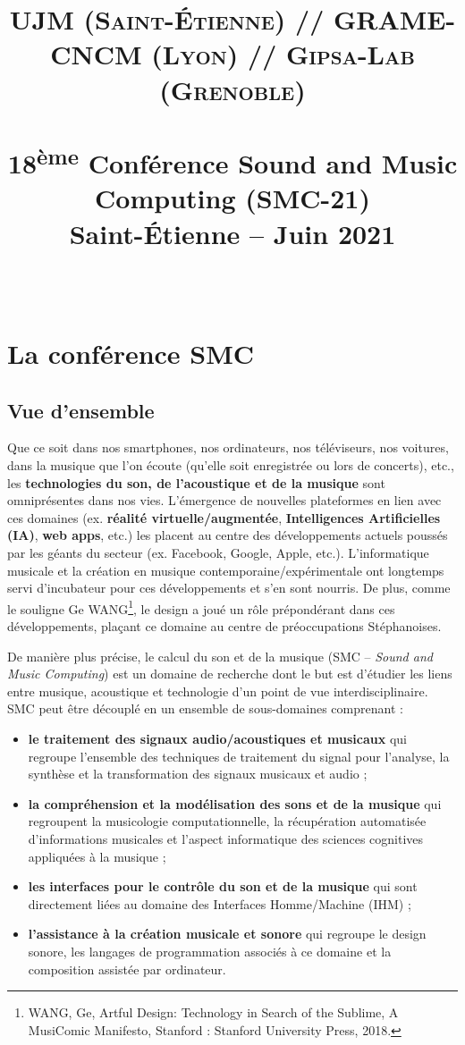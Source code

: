 \documentclass[fontsize=12pt]{scrartcl} %
\title{	
\normalfont \normalsize 
\textsc{UJM (Saint-Étienne) // GRAME-CNCM (Lyon) // Gipsa-Lab (Grenoble)} \\ [25pt] %
\horrule{0.5pt} \\[0.4cm] %
\huge 18\textsuperscript{ème} Conférence Sound and Music Computing (SMC-21)\\ Saint-Étienne -- Juin 2021 \\ %
\horrule{2pt} \\[0.5cm] %
}
\date{} %
\numberwithin{equation}{section} %
\numberwithin{figure}{section} %
\numberwithin{table}{section} %
\begin{document}
\maketitle %

\tableofcontents

\section{La conférence SMC}

\subsection{Vue d'ensemble}

Que ce soit dans nos smartphones, nos ordinateurs, nos téléviseurs, nos voitures, dans la musique que l’on écoute (qu’elle soit enregistrée ou lors de concerts), etc., les \textbf{technologies du son, de l’acoustique et de la musique} sont omniprésentes dans nos vies. L’émergence de nouvelles plateformes en lien avec ces domaines (ex. \textbf{réalité virtuelle/augmentée}, \textbf{Intelligences Artificielles (IA)}, \textbf{web apps}, etc.) les placent au centre des développements actuels poussés par les géants du secteur (ex. Facebook, Google, Apple, etc.). L’informatique musicale et la création en musique contemporaine/expérimentale ont longtemps servi d’incubateur pour ces développements et s’en sont nourris. De plus, comme le souligne Ge WANG\footnote{WANG, Ge, Artful Design: Technology in Search of the Sublime, A MusiComic Manifesto, Stanford : Stanford University Press, 2018.}, le design a joué un rôle prépondérant dans ces développements, plaçant ce domaine au centre de préoccupations Stéphanoises. 

De manière plus précise, le calcul du son et de la musique (SMC -- \textit{Sound and Music Computing}) est un domaine de recherche dont le but est d'étudier les liens entre musique, acoustique et technologie d'un point de vue interdisciplinaire. SMC peut être découplé en un ensemble de sous-domaines comprenant :

\begin{itemize}
  \item \textbf{le traitement des signaux audio/acoustiques et musicaux} qui regroupe l'ensemble des techniques de traitement du signal pour l'analyse, la synthèse et la transformation des signaux musicaux et audio ;
  \item \textbf{la compréhension et la modélisation des sons et de la musique} qui regroupent la musicologie computationnelle, la récupération automatisée d'informations musicales et l'aspect informatique des sciences cognitives appliquées à la musique ;
  \item \textbf{les interfaces pour le contrôle du son et de la musique} qui sont directement liées au domaine des Interfaces Homme/Machine (IHM) ;
  \item \textbf{l'assistance à la création musicale et sonore} qui regroupe le design sonore, les langages de programmation associés à ce domaine et la composition assistée par ordinateur.
\end{itemize}
\end{document}

